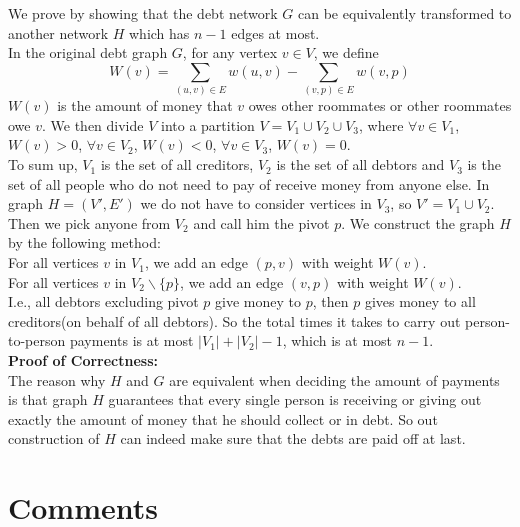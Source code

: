 \documentclass[12pt,letterpaper]{article}
\begin{document}
\section{}
We prove by showing that the debt network $G$ can be equivalently transformed to 
another network $H$ which has $n-1$ edges at most.\\
In the original debt graph $G$, 
for any vertex $v\in V$, 
we define 
$$W(v)=\sum_{(u,v)\in E}w(u,v)-\sum_{(v,p)\in E}w(v,p)$$
$W(v)$ is the amount of money that $v$ owes other roommates or other roommates owe $v$.
We then divide $V$ into a partition $V=V_1\cup V_2\cup V_3$, 
where $\forall v\in V_1$, $W(v)>0$,
$\forall v\in V_2$, $W(v)<0$,
$\forall v\in V_3$, $W(v)=0$.\\
To sum up, $V_1$ is the set of all creditors, 
$V_2$ is the set of all debtors and $V_3$ is the set of all people who 
do not need to pay of receive money from anyone else.
In graph $H=(V',E')$ we do not have to consider vertices in $V_3$,
so $V'=V_1\cup V_2$.\\
Then we pick anyone from $V_2$ and call him the pivot $p$.
We construct the graph $H$ by the following method:\\
For all vertices $v$ in $V_1$, 
we add an edge $(p,v)$ with weight $W(v)$.\\
For all vertices $v$ in $V_2\backslash\{p\}$,
we add an edge $(v,p)$ with weight $W(v)$.\\
I.e., all debtors excluding pivot $p$ give money to $p$,
then $p$ gives money to all creditors(on behalf of all debtors).
So the total times it takes to carry out person-to-person payments is 
at most $|V_1|+|V_2|-1$, which is at most $n-1$.\\
\textbf{Proof of Correctness:}\\
The reason why $H$ and $G$ are equivalent when deciding the amount of payments
is that graph $H$ guarantees that every single person is 
receiving or giving out exactly the amount of money that he should collect 
or in debt.
So out construction of $H$ can indeed make sure that the debts are paid off at last.


\newpage
\section{Comments}
\subsection{}

\subsection{}

\subsection{}
\end{document}
